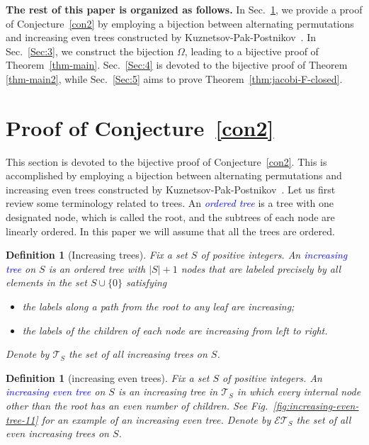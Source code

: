 \documentclass[12pt]{article}
\def\blue{\textcolor{blue}}
\def\blue{\textcolor{blue}}
\numberwithin{equation}{section}
\def\blue{\textcolor{blue}}
\def\blue{\textcolor{blue}}
\theoremstyle{plain}
\newtheorem{definition}[theorem]{Definition}
\begin{document}
  {\bf The rest of this paper is organized as follows.} In Sec.~\ref{Sec:2}, we provide a  proof of Conjecture~\ref{con2} by employing a  bijection between  alternating permutations and increasing even  trees constructed by Kuznetsov-Pak-Postnikov~\cite{KPP}. In Sec.~\ref{Sec:3}, we construct the bijection $\Omega$, leading to a bijective proof of Theorem~\ref{thm-main}. Sec.~\ref{Sec:4} is devoted to the bijective proof of Theorem \ref{thm-main2}, while Sec.~\ref{Sec:5} aims to prove Theorem~\ref{thm:jacobi-F-closed}. 
  
  \section{Proof of Conjecture~\ref{con2}}
  \label{Sec:2}
  This section is devoted to the bijective proof of Conjecture~\ref{con2}.  This is accomplished by employing a  bijection between  alternating permutations and increasing even  trees constructed by Kuznetsov-Pak-Postnikov~\cite{KPP}. 
  Let us first review some terminology related to trees.   An \blue{\em ordered tree} is  a tree with one designated node, which is called the root, and the subtrees of each node are linearly ordered. In this paper we will assume that all the trees are ordered. 
  \begin{definition}[Increasing trees]
  	Fix a  set $S$ of positive integers. An
  	\blue{ increasing tree} on $S$ is an ordered tree with $|S|+1$ nodes that are labeled precisely by all elements in the set $S\cup\{0\}$ satisfying
  	\begin{itemize} 
  		\item  the labels along a path from the root to any leaf are  increasing;
  		\item  the labels of the children of each node are   increasing from left to right.
  	\end{itemize}
  	Denote by  $\mathcal{T}_{S}$ the set of all  increasing trees on  $S$.
  \end{definition}
  
  \begin{definition}[increasing even trees]
  	Fix a  set $S$ of positive integers. An
  	\blue{   increasing even tree} on $S$  is an increasing tree in $\mathcal{T}_S$  in which every internal node other than the root  has an even number of children. 
  	See Fig.~\ref{fig:increasing-even-tree-11}  for an example of  an increasing even tree.  Denote by  $\mathcal{ET}_{S}$ the set of all  even increasing trees on  $S$.
  \end{definition}
  
\end{document}
